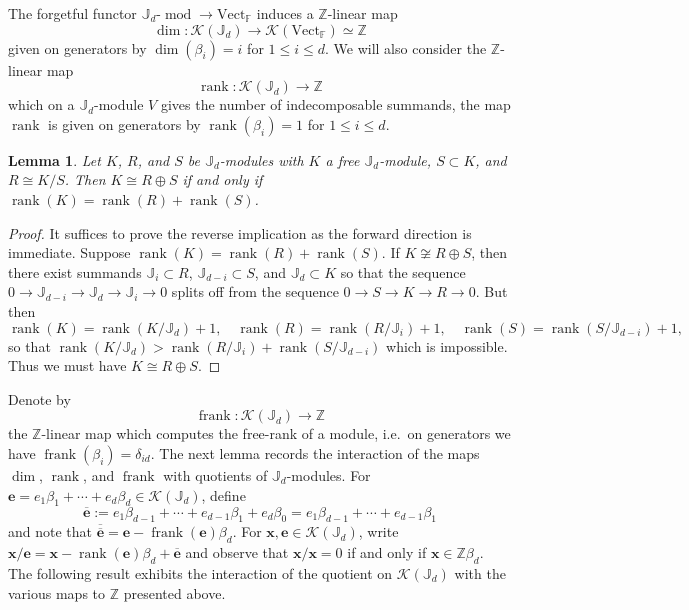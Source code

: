 \documentclass{amsart}
\numberwithin{equation}{section}
\newtheorem{lemma}[theorem]{Lemma}
\theoremstyle{definition}
\def\FF{\mathbb{F}}
\def\JJ{\mathbb{J}}
\def\ZZ{\mathbb{Z}}
\def\bfe{\mathbf{e}}
\def\bfx{\mathbf{x}}
\def\cK{\mathcal{K}}
\def\dim{\operatorname{dim}}
\def\frank{\operatorname{frank}}
\def\rank{\operatorname{rank}}
\def\mod{\operatorname{mod}}
\def\mod{\operatorname{mod}}
\newcommand{\rev}[1]{\overline{#1}}%
\newcommand{\Vect}{\text{Vect}}
\begin{document}
The forgetful functor $\JJ_d$-$\mod\to\Vect_\FF$ induces a $\ZZ$-linear map 
\[\dim:\cK(\JJ_d)\to\cK(\Vect_\FF)\simeq\ZZ\]
given on generators by $\dim(\beta_i)=i$ for $1\le i\le d$.  We will also consider the $\ZZ$-linear map 
\[\rank:\cK(\JJ_d)\to\ZZ\]
which on a $\JJ_d$-module $V$ gives the number of indecomposable summands, the map $\rank$ is given on generators by $\rank(\beta_i)=1$ for $1\le i\le d$.  
\begin{lemma}\label{le:ranks and quotients}
  Let $K$, $R$, and $S$ be $\JJ_d$-modules with $K$ a free $\JJ_d$-module, $S\subset K$, and $R\cong K/S$.  Then $K\cong R\oplus S$ if and only if $\rank(K)=\rank(R)+\rank(S)$.
\end{lemma}
\begin{proof}
  It suffices to prove the reverse implication as the forward direction is immediate.  
  Suppose $\rank(K)=\rank(R)+\rank(S)$.  
  If $K\not\cong R\oplus S$, then there exist summands $\JJ_i\subset R$, $\JJ_{d-i}\subset S$, and $\JJ_d\subset K$ so that the sequence $0\to\JJ_{d-i}\to\JJ_d\to\JJ_i\to0$ splits off from the sequence $0\to S\to K\to R\to 0$.
  But then 
  \[\rank(K)=\rank(K/\JJ_d)+1,\quad\rank(R)=\rank(R/\JJ_i)+1,\quad\rank(S)=\rank(S/\JJ_{d-i})+1,\]
  so that $\rank(K/\JJ_d)>\rank(R/\JJ_i)+\rank(S/\JJ_{d-i})$ which is impossible.  Thus we must have $K\cong R\oplus S$.
\end{proof}
Denote by 
\[\frank:\cK(\JJ_d)\to\ZZ\]
the $\ZZ$-linear map which computes the free-rank of a module, i.e.\ on generators we have $\frank(\beta_i)=\delta_{id}$.  The next lemma records the interaction of the maps $\dim$, $\rank$, and $\frank$ with quotients of $\JJ_d$-modules.  For $\bfe=e_1\beta_1+\cdots+e_d\beta_d\in\cK(\JJ_d)$, define 
\[\rev{\bfe}:=e_1\beta_{d-1}+\cdots+e_{d-1}\beta_1+e_d\beta_0=e_1\beta_{d-1}+\cdots+e_{d-1}\beta_1\]
and note that $\rev{\rev{\bfe}}=\bfe-\frank(\bfe)\beta_d$.  For $\bfx,\bfe\in\cK(\JJ_d)$, write $\bfx/\bfe=\bfx-\rank(\bfe)\beta_d+\rev{\bfe}$ and observe that $\bfx/\bfx=0$ if and only if $\bfx\in\ZZ\beta_d$.  The following result exhibits the interaction of the quotient on $\cK(\JJ_d)$ with the various maps to $\ZZ$ presented above.
\end{document}
